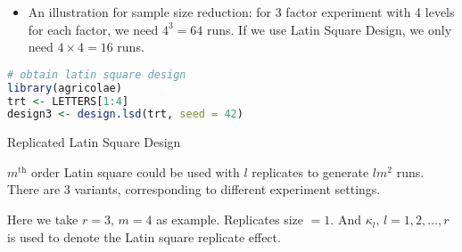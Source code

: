 \begin{itemize}[topsep=2pt,itemsep=0pt]
    \item An illustration for sample size reduction: for 3 factor experiment with 4 levels for each factor, we need $ 4^3=64 $ runs. If we use Latin Square Design, we only need $ 4\times 4=16 $ runs.
\end{itemize}

\begin{rcode}
\begin{lstlisting}[language=R]
# obtain latin square design
library(agricolae)
trt <- LETTERS[1:4] 
design3 <- design.lsd(trt, seed = 42)
\end{lstlisting}
\end{rcode}

\begin{point}
    Replicated Latin Square Design
\end{point}

$ m^\mathrm{ th }  $ order Latin square could be used with $ l $ replicates to generate $ lm^2 $ runs. There are 3 variants, corresponding to different experiment settings.

Here we take $ r=3,\,m=4 $ as example. Replicates size $ =1 $. And $ \kappa _l,\,l=1,2,\ldots,r $ is used to denote the Latin square replicate effect.

